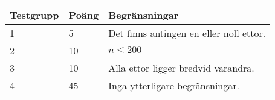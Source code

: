 \noindent
\begin{tabular}{| l | l | l |}
\hline
Testgrupp & Poäng & Begränsningar \\ \hline
1     & 5     & Det finns antingen en eller noll ettor. \\ \hline
2     & 10    & $n \leq 200$ \\ \hline
3     & 10    & Alla ettor ligger bredvid varandra. \\ \hline
4     & 45    & Inga ytterligare begränsningar. \\ \hline
\end{tabular}
